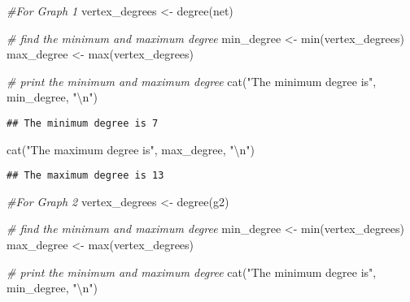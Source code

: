 \documentclass[
]{article}
\newenvironment{Shaded}{\begin{snugshade}}{\end{snugshade}}
\newcommand{\CommentTok}[1]{\textcolor[rgb]{0.56,0.35,0.01}{\textit{#1}}}
\newcommand{\FunctionTok}[1]{\textcolor[rgb]{0.00,0.00,0.00}{#1}}
\newcommand{\NormalTok}[1]{#1}
\newcommand{\OtherTok}[1]{\textcolor[rgb]{0.56,0.35,0.01}{#1}}
\newcommand{\SpecialCharTok}[1]{\textcolor[rgb]{0.00,0.00,0.00}{#1}}
\newcommand{\StringTok}[1]{\textcolor[rgb]{0.31,0.60,0.02}{#1}}
\begin{document}
\begin{Shaded}
\begin{Highlighting}[]
\CommentTok{\#For Graph 1}
\NormalTok{vertex\_degrees }\OtherTok{\textless{}{-}} \FunctionTok{degree}\NormalTok{(net)}

\CommentTok{\# find the minimum and maximum degree}
\NormalTok{min\_degree }\OtherTok{\textless{}{-}} \FunctionTok{min}\NormalTok{(vertex\_degrees)}
\NormalTok{max\_degree }\OtherTok{\textless{}{-}} \FunctionTok{max}\NormalTok{(vertex\_degrees)}

\CommentTok{\# print the minimum and maximum degree}
\FunctionTok{cat}\NormalTok{(}\StringTok{"The minimum degree is"}\NormalTok{, min\_degree, }\StringTok{"}\SpecialCharTok{\textbackslash{}n}\StringTok{"}\NormalTok{)}
\end{Highlighting}
\end{Shaded}

\begin{verbatim}
## The minimum degree is 7
\end{verbatim}

\begin{Shaded}
\begin{Highlighting}[]
\FunctionTok{cat}\NormalTok{(}\StringTok{"The maximum degree is"}\NormalTok{, max\_degree, }\StringTok{"}\SpecialCharTok{\textbackslash{}n}\StringTok{"}\NormalTok{)}
\end{Highlighting}
\end{Shaded}

\begin{verbatim}
## The maximum degree is 13
\end{verbatim}

\begin{Shaded}
\begin{Highlighting}[]
\CommentTok{\#For Graph 2}
\NormalTok{vertex\_degrees }\OtherTok{\textless{}{-}} \FunctionTok{degree}\NormalTok{(g2)}

\CommentTok{\# find the minimum and maximum degree}
\NormalTok{min\_degree }\OtherTok{\textless{}{-}} \FunctionTok{min}\NormalTok{(vertex\_degrees)}
\NormalTok{max\_degree }\OtherTok{\textless{}{-}} \FunctionTok{max}\NormalTok{(vertex\_degrees)}

\CommentTok{\# print the minimum and maximum degree}
\FunctionTok{cat}\NormalTok{(}\StringTok{"The minimum degree is"}\NormalTok{, min\_degree, }\StringTok{"}\SpecialCharTok{\textbackslash{}n}\StringTok{"}\NormalTok{)}
\end{Highlighting}
\end{Shaded}
\end{document}
